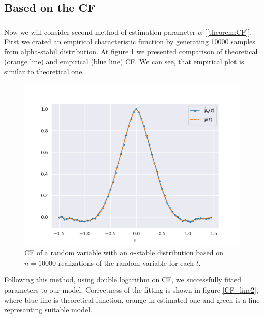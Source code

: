 \documentclass{article}
\begin{document}
		\subsection{Based on the CF}
		\subsubsection{}
		Now we will consider second method of estimation parameter $\alpha$ [\ref{theorem:CF}]. First we crated an empirical characteristic function by generating 10000 samples from alpha-stabil distribution. At figure \ref{cf1} we presented comparison of theoretical (orange line) and empirical (blue line) CF. We can see, that empirical plot is similar to theoretical one.
		
		\begin{figure}[H]
				\centering
				\includegraphics[width=1\linewidth]{images/stable_CF.png}
			\caption{CF of a random variable with an $\alpha$-stable distribution based on $n=10000$ realizations of the random variable for each $t$.}\label{cf1}
		\end{figure}

		Following this method, using double logarithm on CF, we successfully fitted parameters to our model. Correctness of the fitting is shown in figure \ref{CF_line2}, where blue line is theoretical function, orange in estimated one and green is a line represanting suitable model.
		
\end{document}
